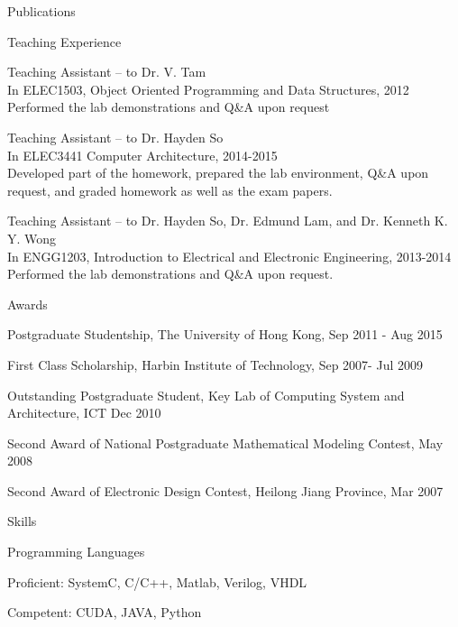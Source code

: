 \documentclass{resume} %
\begin{document}
\begin{rSection}{Publications}
\end{rSection}

\begin{rSection}{Teaching Experience}
    \vspace{-1em}
\item Teaching Assistant – to Dr. V. Tam \\In ELEC1503, Object Oriented Programming 
and Data Structures, 2012 \\Performed the lab demonstrations and Q\&A upon request

\item Teaching Assistant – to Dr. Hayden So \\In ELEC3441 Computer Architecture, 2014-2015
\\Developed part of the homework, prepared the lab environment, Q\&A upon request, and graded homework as well as the exam papers.

\item Teaching Assistant – to Dr. Hayden So, Dr. Edmund Lam, and Dr. Kenneth K. Y. Wong 
\\In ENGG1203, Introduction to Electrical and Electronic Engineering, 2013-2014
\\Performed the lab demonstrations and Q\&A upon request. 

\end{rSection}

\begin{rSection}{Awards}
    \vspace{-1em}
\item Postgraduate Studentship, The University of Hong Kong, Sep 2011 - Aug 2015 
    \vspace{-0.5em}
\item First Class Scholarship, Harbin Institute of Technology, Sep 2007- Jul 2009
    \vspace{-0.5em}
\item Outstanding Postgraduate Student, Key Lab of Computing System and Architecture, ICT Dec 2010
    \vspace{-0.5em}
\item Second Award of National Postgraduate Mathematical Modeling Contest, May 2008
    \vspace{-0.5em}
\item Second Award of Electronic Design Contest, Heilong Jiang Province, Mar 2007
    \vspace{-0.5em}
\end{rSection}

\begin{rSection}{Skills}
    \begin{rSubsection}{Programming Languages}{}{}{}
    \item Proficient: SystemC, C/C++, Matlab, Verilog, VHDL
    \item Competent: CUDA, JAVA, Python
    \end{rSubsection}
\end{rSection}
\end{document}
